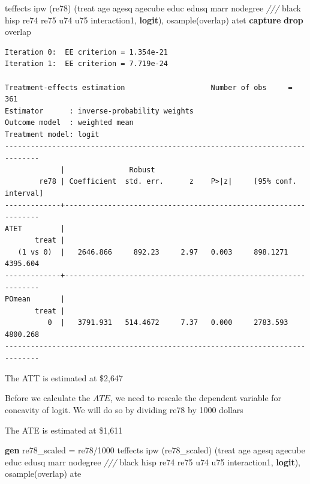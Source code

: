 \documentclass[
]{book}
\newenvironment{Shaded}{\begin{snugshade}}{\end{snugshade}}
\newcommand{\BaseNTok}[1]{\textcolor[rgb]{0.00,0.00,0.81}{#1}}
\newcommand{\CommentTok}[1]{\textcolor[rgb]{0.56,0.35,0.01}{\textit{#1}}}
\newcommand{\KeywordTok}[1]{\textcolor[rgb]{0.13,0.29,0.53}{\textbf{#1}}}
\newcommand{\NormalTok}[1]{#1}
\begin{document}
\begin{Shaded}
\begin{Highlighting}[]
\NormalTok{teffects ipw (re78) (treat age agesq agecube educ edusq marr nodegree }\CommentTok{///}
\BaseNTok{black}\NormalTok{ hisp re74 re75 u74 u75 interaction1, }\KeywordTok{logit}\NormalTok{), osample(overlap) atet}
\KeywordTok{capture} \KeywordTok{drop}\NormalTok{ overlap}
\end{Highlighting}
\end{Shaded}

\begin{verbatim}
Iteration 0:  EE criterion = 1.354e-21  
Iteration 1:  EE criterion = 7.719e-24  

Treatment-effects estimation                    Number of obs     =        361
Estimator      : inverse-probability weights
Outcome model  : weighted mean
Treatment model: logit
------------------------------------------------------------------------------
             |               Robust
        re78 | Coefficient  std. err.      z    P>|z|     [95% conf. interval]
-------------+----------------------------------------------------------------
ATET         |
       treat |
   (1 vs 0)  |   2646.866     892.23     2.97   0.003     898.1271    4395.604
-------------+----------------------------------------------------------------
POmean       |
       treat |
          0  |   3791.931   514.4672     7.37   0.000     2783.593    4800.268
------------------------------------------------------------------------------
\end{verbatim}

The ATT is estimated at \$2,647

Before we calculate the \(ATE\), we need to rescale the dependent variable for concavity of logit. We will do so by dividing re78 by 1000 dollars

The ATE is estimated at \$1,611

\begin{Shaded}
\begin{Highlighting}[]
\KeywordTok{gen}\NormalTok{ re78\_scaled = re78/1000}
\NormalTok{teffects ipw (re78\_scaled) (treat age agesq agecube educ edusq marr nodegree }\CommentTok{///}
\BaseNTok{black}\NormalTok{ hisp re74 re75 u74 u75 interaction1, }\KeywordTok{logit}\NormalTok{), osample(overlap) ate}
\end{Highlighting}
\end{Shaded}
\end{document}
